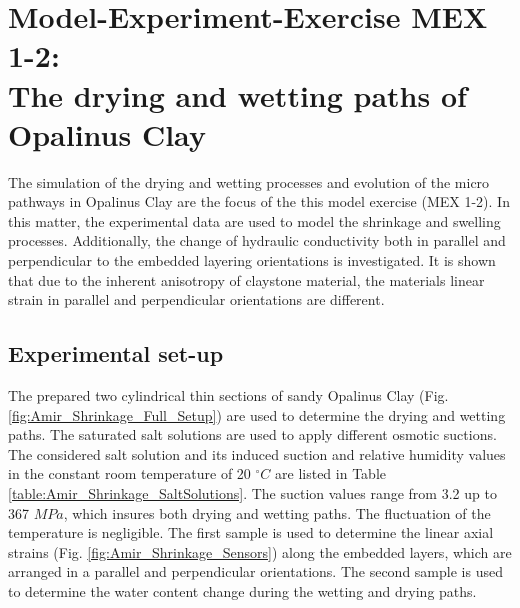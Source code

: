 \section[MEX 1-2: Drying and wetting in OPA]{Model-Experiment-Exercise MEX 1-2:\\The drying and wetting paths of Opalinus Clay}
\label{sec:mex06}
The simulation of the drying and wetting processes and evolution of the micro pathways in Opalinus Clay are the focus of the this model exercise (MEX 1-2). In this matter, the experimental data are used to model the shrinkage and swelling processes. Additionally, the change of hydraulic conductivity both in parallel and perpendicular to the embedded layering orientations is investigated. It is shown that due to the inherent anisotropy of claystone material, the materials linear strain in parallel and perpendicular orientations are different.  
\subsection{Experimental set-up}
The prepared two cylindrical thin sections of sandy Opalinus Clay (Fig. \ref{fig:Amir_Shrinkage_Full_Setup}) are used to determine the drying and wetting paths. The saturated salt solutions are used to apply different osmotic suctions. The considered salt solution and its induced suction and relative humidity values in the constant room temperature of 20 $^{\circ}C$ are listed in Table \ref{table:Amir_Shrinkage_SaltSolutions}. The suction values range from 3.2 up to 367 $MPa$, which insures both drying and wetting paths. The fluctuation of the temperature is negligible. The first sample is used to determine the linear axial strains (Fig. \ref{fig:Amir_Shrinkage_Sensors}) along the embedded layers, which are arranged in a parallel and perpendicular orientations. The second sample is used to determine the water content change during the wetting and drying paths.

